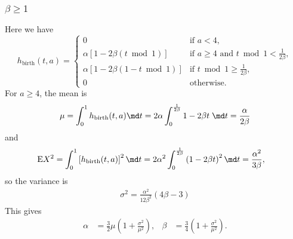 \documentclass{jpmarticle}
\begin{document}
\subsubsection{$\beta \geq 1$}

Here we have
\begin{equation}
  h_{\text{birth}}(t, a) =
  \begin{cases}
    0 & \text{if $a < 4$},
    \\
    \alpha \left[1 - 2 \beta (t \bmod 1)\right]
    & \text{if $a \geq 4$ and $t \bmod 1 < \frac{1}{2 \beta}$},
    \\
    \alpha \left[1 - 2 \beta (1 - t \bmod 1)\right]
    & \text{if $t \bmod 1 \geq \frac{1}{2 \beta}$},
    \\
    0 & \text{otherwise}.
  \end{cases}
\end{equation}
For $a \geq 4$, the mean is
\begin{align}
  \mu = \int_0^1 h_{\text{birth}}(t, a) \md t
  = 2 \alpha \int_0^{\frac{1}{2 \beta}} 1 - 2 \beta t \; \md t
  = \frac{\alpha}{2 \beta}
\end{align}
and
\begin{align}
  \text{E} X^2 &= \int_0^1 \left[h_{\text{birth}}(t, a)\right]^2 \md t
  = 2 \alpha^2 \int_0^{\frac{1}{2 \beta}} \left(1 - 2 \beta t\right)^2 \md t
  = \frac{\alpha^2}{3 \beta},
\end{align}
so the variance is
\begin{align}
  \sigma^2 = \frac{\alpha^2}{12 \beta^2} (4 \beta - 3)
\end{align}
This gives
\begin{align}
  \alpha &= \frac{3}{2} \mu \left(1 + \frac{\sigma^2}{\mu^2}\right),
  &
  \beta &= \frac{3}{4} \left(1 + \frac{\sigma^2}{\mu^2}\right).
\end{align}
\end{document}

